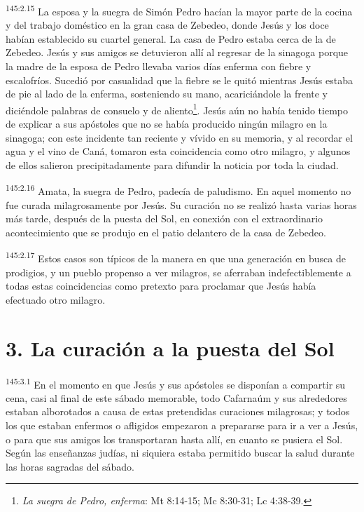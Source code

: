 \par 
\textsuperscript{145:2.15} La esposa y la suegra de Simón Pedro hacían la mayor parte de la cocina y del trabajo doméstico en la gran casa de Zebedeo, donde Jesús y los doce habían establecido su cuartel general. La casa de Pedro estaba cerca de la de Zebedeo. Jesús y sus amigos se detuvieron allí al regresar de la sinagoga porque la madre de la esposa de Pedro llevaba varios días enferma con fiebre y escalofríos. Sucedió por casualidad que la fiebre se le quitó mientras Jesús estaba de pie al lado de la enferma, sosteniendo su mano, acariciándole la frente y diciéndole palabras de consuelo y de aliento\footnote{\textit{La suegra de Pedro, enferma}: Mt 8:14-15; Mc 8:30-31; Lc 4:38-39.}. Jesús aún no había tenido tiempo de explicar a sus apóstoles que no se había producido ningún milagro en la sinagoga; con este incidente tan reciente y vívido en su memoria, y al recordar el agua y el vino de Caná, tomaron esta coincidencia como otro milagro, y algunos de ellos salieron precipitadamente para difundir la noticia por toda la ciudad.

\par 
\textsuperscript{145:2.16} Amata, la suegra de Pedro, padecía de paludismo. En aquel momento no fue curada milagrosamente por Jesús. Su curación no se realizó hasta varias horas más tarde, después de la puesta del Sol, en conexión con el extraordinario acontecimiento que se produjo en el patio delantero de la casa de Zebedeo.

\par 
\textsuperscript{145:2.17} Estos casos son típicos de la manera en que una generación en busca de prodigios, y un pueblo propenso a ver milagros, se aferraban indefectiblemente a todas estas coincidencias como pretexto para proclamar que Jesús había efectuado otro milagro.

\section*{3. La curación a la puesta del Sol}
\par 
\textsuperscript{145:3.1} En el momento en que Jesús y sus apóstoles se disponían a compartir su cena, casi al final de este sábado memorable, todo Cafarnaúm y sus alrededores estaban alborotados a causa de estas pretendidas curaciones milagrosas; y todos los que estaban enfermos o afligidos empezaron a prepararse para ir a ver a Jesús, o para que sus amigos los transportaran hasta allí, en cuanto se pusiera el Sol. Según las enseñanzas judías, ni siquiera estaba permitido buscar la salud durante las horas sagradas del sábado.

